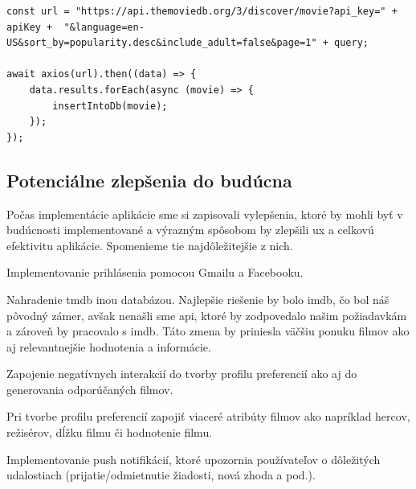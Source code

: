\begin{lstlisting}[caption={Get request na TMDb}, label={appjs-navDone}] 
const url = "https://api.themoviedb.org/3/discover/movie?api_key=" + apiKey +  "&language=en-US&sort_by=popularity.desc&include_adult=false&page=1" + query;

await axios(url).then((data) => {
    data.results.forEach(async (movie) => {
        insertIntoDb(movie);
    });
});

\end{lstlisting}
\subsection{Potenciálne zlepšenia do budúcna}
Počas implementácie aplikácie sme si zapisovali vylepšenia, ktoré by mohli byť v budúcnosti implementované a výrazným spôsobom by zlepšili \acrshort{ux} a celkovú efektivitu aplikácie. Spomenieme tie najdôležitejšie z nich.
\begin{itemize}
{\item Implementovanie prihlásenia pomocou Gmailu a Facebooku.}
{\item Nahradenie \acrshort{tmdb} inou databázou. Najlepšie riešenie by bolo \acrshort{imdb}, čo bol náš pôvodný zámer, avšak nenašli sme \acrshort{api}, ktoré by zodpovedalo našim požiadavkám a zároveň by pracovalo s \acrshort{imdb}. Táto zmena by priniesla väčšiu ponuku filmov ako aj relevantnejšie hodnotenia a informácie.}
{\item Zapojenie negatívnych interakcií do tvorby profilu preferencií ako aj do generovania odporúčaných filmov.}
{\item Pri tvorbe profilu preferencií zapojiť viaceré atribúty filmov ako napríklad hercov, režisérov, dĺžku filmu či hodnotenie filmu.}
{\item Implementovanie push notifikácií, ktoré upozornia používateľov o dôležitých udalostiach (prijatie/odmietnutie žiadosti, nová zhoda a pod.).}
\end{itemize}









